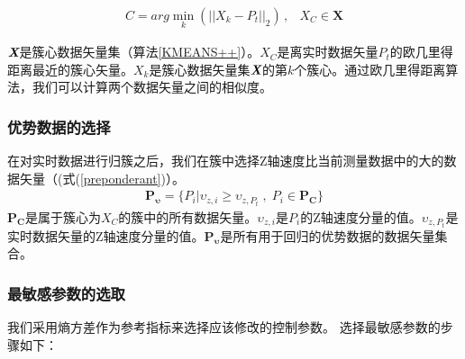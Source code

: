 \begin{eqnarray}\label{cluster}
C=arg\min \limits_{k}{(||X_{k}-P_{t}||_{2})} \, ,&X_{C}\in \bm{X}
\end{eqnarray}

$\textit{\textbf{X}}$是簇心数据矢量集（算法\ref{KMEANS++}）。$X_{C}$是离实时数据矢量$P_t$的欧几里得距离最近的簇心矢量。$X_{k}$是簇心数据矢量集$\textit{\textbf{X}}$的第$k$个簇心。通过欧几里得距离算法，我们可以计算两个数据矢量之间的相似度。

\subsubsection{优势数据的选择}
在对实时数据进行归簇之后，我们在簇中选择Z轴速度比当前测量数据中的大的数据矢量（(式(\ref{preponderant})）。
\begin{eqnarray}\label{preponderant}
\bm{P_{\upsilon}}=\{P_{i} | \upsilon_{z,i}\geq \upsilon_{z,P_{t}} \; , \; P_{i}\in \bm{P_{C}}\}
\end{eqnarray}
$\bm{P_{C}}$是属于簇心为$X_{C}$的簇中的所有数据矢量。$\upsilon_{z,i}$是$P_{i}$的Z轴速度分量的值。$\upsilon_{z,P_{t}}$是实时数据矢量的Z轴速度分量的值。$\bm{P_{\upsilon}}$是所有用于回归的优势数据的数据矢量集合。

\subsubsection{最敏感参数的选取}
我们采用熵方差作为参考指标来选择应该修改的控制参数。 选择最敏感参数的步骤如下：


